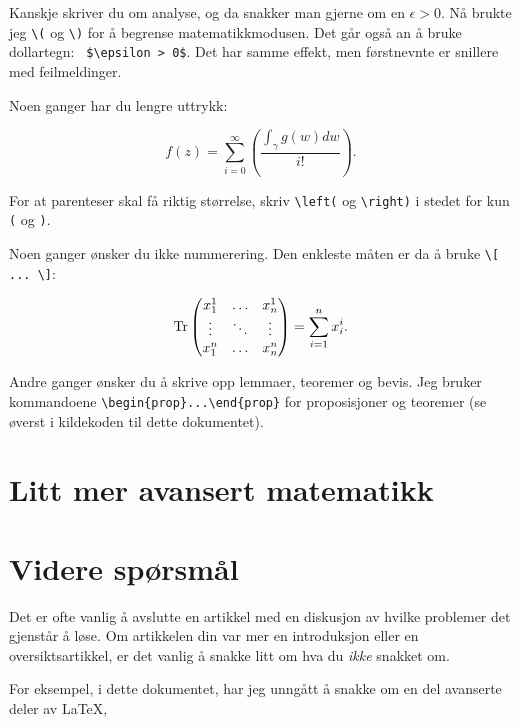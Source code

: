 \documentclass[11pt, english, a4paper]{article}
\begin{document}
Kanskje skriver du om analyse, og da snakker man gjerne om en \(\epsilon > 0 \). Nå brukte jeg \verb|\(| og \verb|\)| for å begrense matematikkmodusen. Det går også an å bruke dollartegn: \verb| $\epsilon > 0$|. Det har samme effekt, men førstnevnte er snillere med feilmeldinger.

Noen ganger har du lengre uttrykk:

\begin{equation}
f(z) = \sum_{i=0}^\infty \left( 
\frac{\int_\gamma g(w) dw}{i!}
\right).
\end{equation}

For at parenteser skal få riktig størrelse, skriv \verb|\left(| og \verb|\right)| i stedet for kun \texttt{(} og \texttt{)}.

Noen ganger ønsker du ikke nummerering. Den enkleste måten er da å bruke \verb|\[ ... \]|:

\[
\operatorname{Tr} \begin{pmatrix}
x_1^1 & \hdots & x_n^1 \\
\vdots & \ddots &  \vdots \\
x_1^n & \hdots & x_n^n
\end{pmatrix} = \sum_{i=1}^n x_i^i.
\]

Andre ganger ønsker du å skrive opp lemmaer, teoremer og bevis. Jeg bruker kommandoene \verb|\begin{prop}...\end{prop}| for proposisjoner og teoremer (se øverst i kildekoden til dette dokumentet). 

\section{Litt mer avansert matematikk}



\section{Videre spørsmål}

Det er ofte vanlig å avslutte en artikkel med en diskusjon av hvilke problemer det gjenstår å løse. Om artikkelen din var mer en introduksjon eller en oversiktsartikkel, er det vanlig å snakke litt om hva du \emph{ikke} snakket om.

For eksempel, i dette dokumentet, har jeg unngått å snakke om en del avanserte deler av \LaTeX, 
\end{document}
